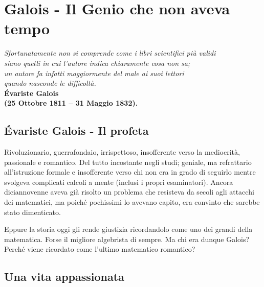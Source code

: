 
\chapter{Galois - Il Genio che non aveva tempo}
\begin{minipage}{1.46\linewidth}
		\begin{flushright}
			\emph{Sfortunatamente non si comprende come i libri scientifici più validi\\ siano quelli in cui l’autore indica chiaramente cosa non sa;\\ un autore fa infatti maggiormente del male ai suoi lettori\\ quando nasconde le difficoltà.}\\
			\vspace{0.5cm}
			\bfseries{Évariste Galois} \\
			\textnormal{(25 Ottobre 1811 – 31 Maggio 1832)}.
		\end{flushright}
\end{minipage}
\section{Évariste Galois - Il profeta}

Rivoluzionario, guerrafondaio, irrispettoso, insofferente verso la mediocrità, passionale e romantico. Del tutto incostante negli studi; geniale, ma refrattario all’istruzione formale e insofferente verso chi non era in grado di seguirlo mentre svolgeva complicati calcoli a mente (inclusi i propri esaminatori). Ancora diciannovenne aveva già risolto un problema che resisteva da secoli agli attacchi dei matematici, ma poiché pochissimi lo avevano capito, era convinto che sarebbe stato dimenticato.


Eppure la storia oggi gli rende giustizia ricordandolo come uno dei grandi della matematica. Forse il migliore algebrista di sempre. Ma chi era dunque Galois? Perché viene ricordato come l’ultimo matematico romantico?

\section{Una vita appassionata}

